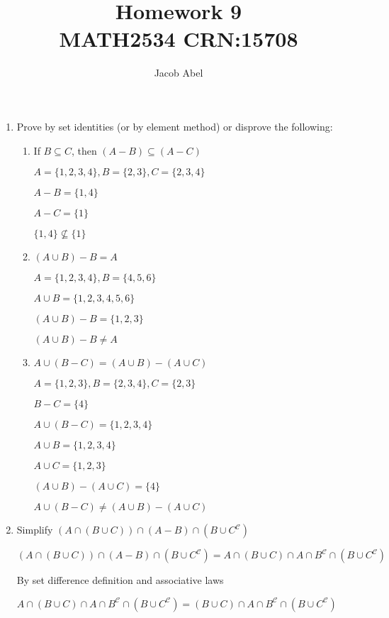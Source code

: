 \documentclass[12pt,letterpaper,titlepage]{article}
\author{Jacob Abel}
\title{	Homework 9
	\\\large MATH2534 CRN:15708
}
\begin{document}
\maketitle
\begin{raggedright}

\begin{enumerate}

\item Prove by set identities (or by element method) or disprove the following:

\begin{enumerate}[label=(\alph*)]
\item If $B\subseteq C$, then $(A-B)\subseteq (A-C)$

$A=\{1, 2, 3, 4\}, B=\{2, 3\}, C=\{2,3,4\}$

$A-B = \{1, 4\}$

$A-C = \{1\}$

$\{1, 4\} \not\subseteq \{1\}$

\item $(A\cup B)-B = A$

$A=\{1, 2, 3, 4\}, B=\{4, 5, 6\}$

$A\cup B = \{1, 2, 3, 4, 5, 6\}$

$(A\cup B) - B = \{1, 2, 3\}$

$(A\cup B) - B \neq A$

\item $A\cup(B-C)=(A\cup B)-(A\cup C)$

$A=\{1, 2, 3\}, B=\{2, 3, 4\}, C=\{2,3\}$

$B-C = \{4\}$

$A\cup(B-C) = \{1, 2, 3, 4\}$

$A\cup B = \{1, 2, 3, 4\}$

$A\cup C = \{1, 2, 3\}$

$(A\cup B)-(A\cup C) = \{4\}$

$A\cup(B-C) \neq (A\cup B)-(A\cup C)$

\end{enumerate}

\item Simplify $(A\cap(B\cup C))\cap(A-B)\cap(B\cup C^\mathcal{C})$

$(A\cap(B\cup C))\cap(A-B)\cap(B\cup C^\mathcal{C}) = A\cap(B\cup C)\cap A\cap B^\mathcal{C}\cap (B\cup C^\mathcal{C})$

By set difference definition and associative laws

$A\cap(B\cup C)\cap A\cap B^\mathcal{C}\cap (B\cup C^\mathcal{C}) = (B\cup C)\cap A\cap B^\mathcal{C}\cap (B\cup C^\mathcal{C})$


\end{enumerate}
\end{raggedright}
\end{document}
